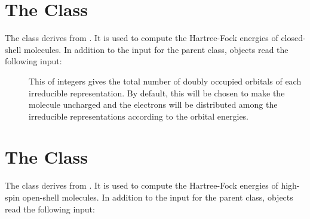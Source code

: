 
\section{The  Class}
\label{CLSCF}

The  class derives from .  It is used to compute
the Hartree-Fock energies of closed-shell molecules.  In addition to the
input for the  parent class,  objects read the
following input:

\begin{description}
  \item[] This  of integers gives the
     total number of doubly occupied orbitals of each irreducible
     representation.  By default, this will be chosen to make the molecule
     uncharged and the electrons will be distributed among the irreducible
     representations according to the orbital energies.

\end{description}


\section{The  Class}
\label{HSOSSCF}

The  class derives from .  It is used to
compute the Hartree-Fock energies of high-spin open-shell molecules.  In
addition to the input for the  parent class, 
objects read the following input:

